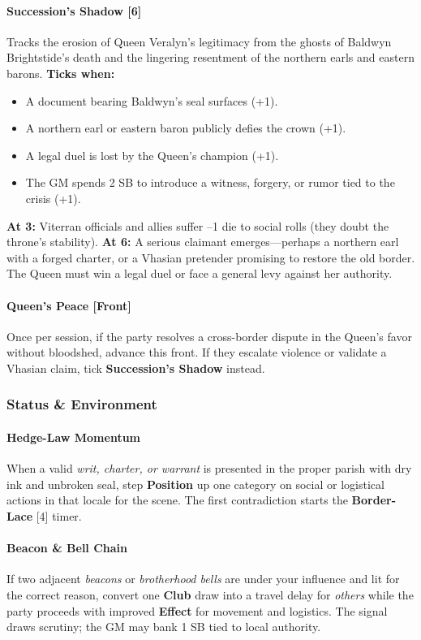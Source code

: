 \paragraph{Succession's Shadow [6]}
Tracks the erosion of Queen Veralyn's legitimacy from the ghosts of Baldwyn Brightstide's death and the lingering resentment of the northern earls and eastern barons. \textbf{Ticks when:}
\begin{itemize}[nosep]
  \item A document bearing Baldwyn's seal surfaces (+1).
  \item A northern earl or eastern baron publicly defies the crown (+1).
  \item A legal duel is lost by the Queen's champion (+1).
  \item The GM spends 2 SB to introduce a witness, forgery, or rumor tied to the crisis (+1).
\end{itemize}
\textbf{At 3:} Viterran officials and allies suffer --1 die to social rolls (they doubt the throne's stability). \textbf{At 6:} A serious claimant emerges---perhaps a northern earl with a forged charter, or a Vhasian pretender promising to restore the old border. The Queen must win a legal duel or face a general levy against her authority.

\paragraph{Queen's Peace [Front]}
Once per session, if the party resolves a cross-border dispute in the Queen's favor without bloodshed, advance this front. If they escalate violence or validate a Vhasian claim, tick \textbf{Succession's Shadow} instead.

\subsubsection{Status \& Environment}

\paragraph{Hedge-Law Momentum}
When a valid \emph{writ, charter, or warrant} is presented in the proper parish with dry ink and unbroken seal, step \textbf{Position} up one category on social or logistical actions in that locale for the scene. The first contradiction starts the \textbf{Border-Lace} [4] timer.

\paragraph{Beacon \& Bell Chain}
If two adjacent \emph{beacons} or \emph{brotherhood bells} are under your influence and lit for the correct reason, convert one \textbf{Club} draw into a travel delay for \emph{others} while the party proceeds with improved \textbf{Effect} for movement and logistics. The signal draws scrutiny; the GM may bank 1 SB tied to local authority.


